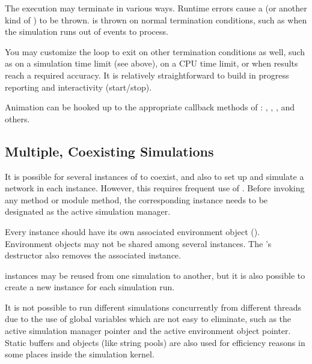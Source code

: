 The execution may terminate in various ways. Runtime errors cause a
 (or another kind of ) to be
thrown.  is thrown on normal termination
conditions, such as when the simulation runs out of events to process.

You may customize the loop to exit on other termination conditions as well,
such as on a simulation time limit (see above), on a CPU time limit, or when
results reach a required accuracy. It is relatively straightforward to
build in progress reporting and interactivity (start/stop).

Animation can be hooked up to the appropriate callback methods of
: , , ,
and others.


\subsection{Multiple, Coexisting Simulations}
\label{sec:embedding:multiple-coexisting-simulations}

It is possible for several instances of  to coexist,
and also to set up and simulate a network in each instance. However, this
requires frequent use of .
Before invoking any  method or module method,
the corresponding  instance needs to be designated
as the active simulation manager.

Every  instance should have its own associated
environment object (). Environment objects may not be
shared among several  instances. The
's destructor also removes the associated
 instance.

 instances may be reused from one simulation to another,
but it is also possible to create a new instance for each simulation run.

\begin{note}
It is not possible to run different simulations concurrently from
different threads due to the use of global variables which are not easy
to eliminate, such as the active simulation manager pointer and the active
environment object pointer. Static buffers and objects (like string pools)
are also used for efficiency reasons in some places inside the simulation
kernel.
\end{note}


